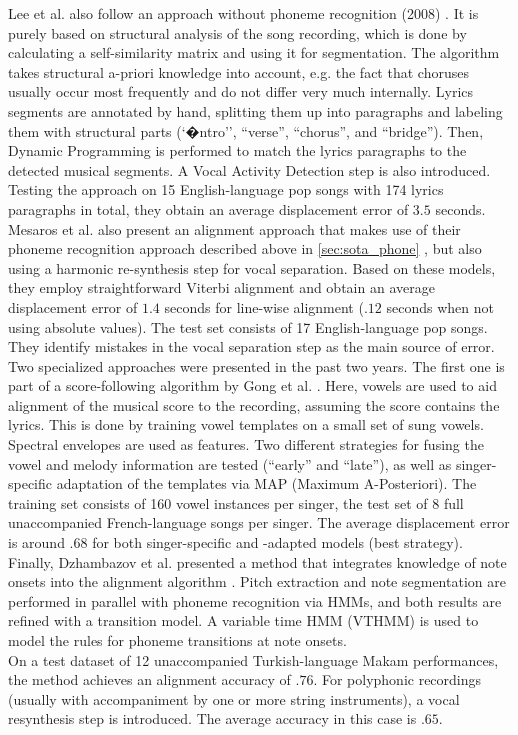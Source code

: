 Lee et al. also follow an approach without phoneme recognition (2008) \cite{LeeC08}. It is purely based on structural analysis of the song recording, which is done by calculating a self-similarity matrix and using it for segmentation. The algorithm takes structural a-priori knowledge into account, e.g. the fact that choruses usually occur most frequently and do not differ very much internally. Lyrics segments are annotated by hand, splitting them up into paragraphs and labeling them with structural parts (`�ntro'', ``verse'', ``chorus'', and ``bridge''). Then, Dynamic Programming is performed to match the lyrics paragraphs to the detected musical segments. A Vocal Activity Detection step is also introduced. Testing the approach on 15 English-language pop songs with 174 lyrics paragraphs in total, they obtain an average displacement error of $3.5$ seconds.\\ %

Mesaros et al. also present an alignment approach that makes use of their phoneme recognition approach described above in \ref{sec:sota_phone} \cite{mesaros_alignment}, but also using a harmonic re-synthesis step for vocal separation. Based on these models, they employ straightforward Viterbi alignment and obtain an average displacement error of $1.4$ seconds for line-wise alignment ($.12$ seconds when not using absolute values). The test set consists of 17 English-language pop songs. They identify mistakes in the vocal separation step as the main source of error.\\ %

Two specialized approaches were presented in the past two years. The first one is part of a score-following algorithm by Gong et al. \cite{gong_alignment}. Here, vowels are used to aid alignment of the musical score to the recording, assuming the score contains the lyrics. This is done by training vowel templates on a small set of sung vowels. Spectral envelopes are used as features. Two different strategies for fusing the vowel and melody information are tested (``early'' and ``late''), as well as singer-specific adaptation of the templates via MAP (Maximum A-Posteriori). The training set consists of 160 vowel instances per singer, the test set of 8 full unaccompanied French-language songs per singer.  The average displacement error is around $.68$ for both singer-specific and -adapted models (best strategy).\\

Finally, Dzhambazov et al. presented a method that integrates knowledge of note onsets into the alignment algorithm \cite{dzhambazov_alignment}. Pitch extraction and note segmentation are performed in parallel with phoneme recognition via HMMs, and both results are refined with a transition model. A variable time HMM (VTHMM) is used to model the rules for phoneme transitions at note onsets.\\
On a test dataset of 12 unaccompanied Turkish-language Makam performances, the method achieves an alignment accuracy of $.76$. For polyphonic recordings (usually with accompaniment by one or more string instruments), a vocal resynthesis step is introduced. The average accuracy in this case is $.65$.



